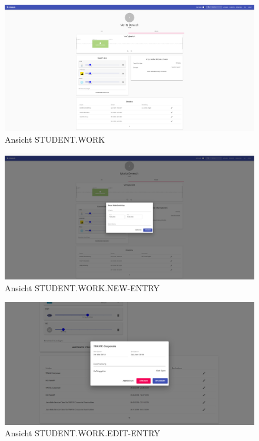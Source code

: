 \documentclass[
  12pt,
  ngerman,
  a4paper,
]{article}
\begin{document}
\begin{figure}
\centering
\includegraphics{./tex2pdf.-930e6666e1221838/3fcf93b7c7c70c0ec7ba98351dd035514a9bc92b.png}
\caption{Ansicht STUDENT.WORK}
\end{figure}

\begin{figure}
\centering
\includegraphics{./tex2pdf.-930e6666e1221838/e861a0f50de01e967b15da07f60cce10b9c4e729.png}
\caption{Ansicht STUDENT.WORK.NEW-ENTRY}
\end{figure}

\begin{figure}
\centering
\includegraphics{./tex2pdf.-930e6666e1221838/4c63a93237317c668e20509da7541b02094f7800.png}
\caption{Ansicht STUDENT.WORK.EDIT-ENTRY}
\end{figure}
\end{document}
